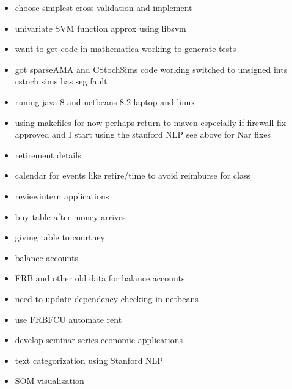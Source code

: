 \documentclass[hyperref]{labbook}
\begin{document}
  \begin{itemize}
  \item choose simplest cross validation and implement
  \end{itemize}
\begin{itemize}
\item univariate SVM function approx using libsvm
\end{itemize}



\begin{itemize}
\item want to get code in mathematica working to generate tests 
\item got sparseAMA and CStochSims code working switched to unsigned ints cstoch sims has seg fault
\item runing java 8 and netbeans 8.2 laptop and linux
\item using makefiles for now perhaps return to maven especially if firewall fix approved and I start using the stanford NLP see above for Nar fixes
\end{itemize}



\begin{itemize}
\item retirement details
\item calendar for events like retire/time to avoid reimburse for class
\item reviewintern applications
\item buy table after money arrives
\item giving table to courtney
\item balance accounts
\item FRB and other old data for balance accounts
\item need to update dependency checking in netbeans
\item use FRBFCU automate rent
\end{itemize}
\begin{itemize}
\item develop seminar series economic applications
\item text categorization using Stanford NLP
\item SOM visualization
  \end{itemize}
\end{document}
